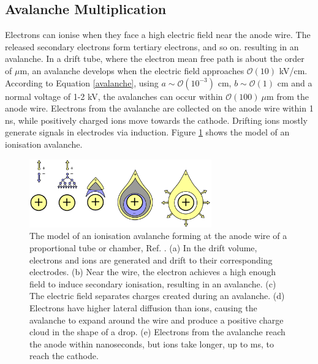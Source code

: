 \subsection{Avalanche Multiplication}
Electrons can ionise when they face a high electric field near the anode wire. 
The released secondary electrons form tertiary electrons, and so on.
%
resulting in an avalanche. In a drift tube, where the electron mean free path is about the order of $\mu$m, 
an avalanche develops when the electric field approaches $\mathcal{O}(10)$ kV/cm.
According to Equation \ref{avalanche}, using $a \sim \mathcal{O}(10^{-3})$ cm, $b \sim \mathcal{O}(1)$ cm and
a normal voltage of 1-2 kV, the avalanches can occur within $\mathcal{O}(100) \ \mu$m from the anode wire. 
Electrons from the avalanche are collected on the anode wire within 1 ns, while positively charged ions move towards the cathode.
Drifting ions mostly generate signals in electrodes via induction. Figure \ref{fig:avalanche} shows the model of an ionisation avalanche.
\begin{figure}[!h]
    \centering
    \includegraphics[width =0.7\textwidth]{figures/png/Screenshot_20240330_182509.png}
    \caption[The model of an ionisation avalanche forming at the anode wire of a proportional tube.]{The model of an ionisation avalanche forming at the anode wire of a proportional tube or chamber, Ref. \cite{kola}. 
    (a) In the drift volume, electrons and ions are generated and drift to their corresponding electrodes. 
    (b) Near the wire, the electron achieves a high enough field to induce secondary ionisation, resulting in an avalanche. 
    (c) The electric field separates charges created during an avalanche. 
    (d) Electrons have higher lateral diffusion than ions, causing the avalanche to expand 
    around the wire and produce a positive charge cloud in the shape of a drop. 
    (e) Electrons from the avalanche reach the anode within nanoseconds, but ions take longer, up to ms, to reach the cathode.}
    \label{fig:avalanche}
\end{figure}
